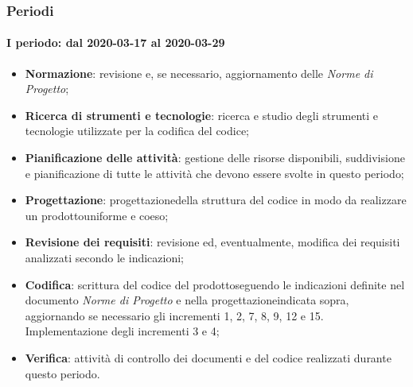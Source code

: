 \subsubsection{Periodi}
\paragraph*{I periodo: dal 2020-03-17 al 2020-03-29}
\begin{itemize}
	\item \textbf{Normazione}: revisione e, se necessario, aggiornamento delle \textit{Norme di Progetto};
	\item \textbf{Ricerca di strumenti e tecnologie}: ricerca e studio degli strumenti e tecnologie utilizzate per la codifica del codice;
	\item \textbf{Pianificazione delle attività}: gestione delle risorse disponibili, suddivisione e pianificazione di tutte le attività che devono essere svolte in questo periodo;
	\item \textbf{Progettazione}\glo: progettazione\glosp della struttura del codice in modo da realizzare un prodotto\glosp uniforme e coeso;
	\item \textbf{Revisione dei requisiti}: revisione ed, eventualmente, modifica dei requisiti analizzati secondo le indicazioni; 
	\item \textbf{Codifica}: scrittura del codice del prodotto\glosp seguendo le indicazioni definite nel documento \textit{Norme di Progetto} e nella progettazione\glosp indicata sopra, aggiornando se necessario gli incrementi 1, 2, 7, 8, 9, 12 e 15. Implementazione degli incrementi 3 e 4; 
	\item \textbf{Verifica}: attività di controllo dei documenti e del codice realizzati durante questo periodo.
\end{itemize}

